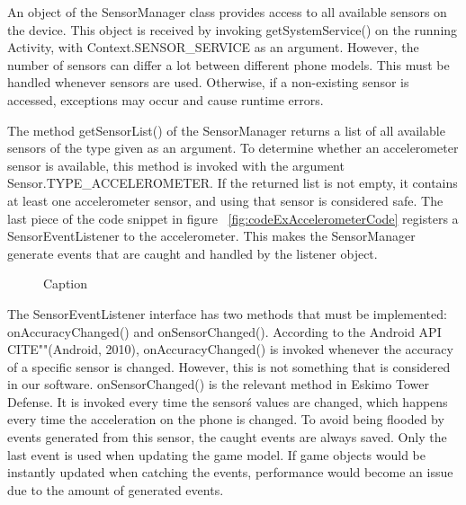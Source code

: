 An object of the SensorManager class provides access to all available sensors on the device. This object is received by invoking getSystemService() on the running Activity, with Context.SENSOR\_SERVICE as an argument. However, the number of sensors can differ a lot between different phone models. This must be handled whenever sensors are used. Otherwise, if a non-existing sensor is accessed, exceptions may occur and cause runtime errors.
 
The method getSensorList() of the SensorManager returns a list of all available sensors of the type given as an argument. To determine whether an accelerometer sensor is available, this method is invoked with the argument Sensor.TYPE\_ACCELEROMETER. If the returned list is not empty, it contains at least one accelerometer sensor, and using that sensor is considered safe. The last piece of the code snippet in figure ~\ref{fig:codeExAccelerometerCode} registers a SensorEventListener to the accelerometer. This makes the SensorManager generate events that are caught and handled by the listener object.

\begin{figure}[htb]

\begin{small}

\end{small}

\caption{Caption}
\label{fig:codeExAccelerometerSensorEvent}

\end{figure}

The SensorEventListener interface has two methods that must be implemented: onAccuracyChanged() and onSensorChanged(). According to the Android API CITE""(Android, 2010), onAccuracyChanged() is invoked whenever the accuracy of a specific sensor is changed. However, this is not something that is considered in our software. onSensorChanged() is the relevant method in Eskimo Tower Defense. It is invoked every time the sensor\'s values are changed, which happens every time the acceleration on the phone is changed. To avoid being flooded by events generated from this sensor, the caught events are always saved. Only the last event is used when updating the game model. If game objects would be instantly updated when catching the events, performance would become an issue due to the amount of generated events.